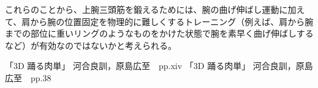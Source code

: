 \documentclass{jsarticle}
\begin{document}
これらのことから、上腕三頭筋を鍛えるためには、腕の曲げ伸ばし運動に加えて、肩から腕の位置固定を物理的に難しくするトレーニング（例えば、肩から腕までの部位に重いリングのようなものをかけた状態で腕を素早く曲げ伸ばしするなど）が有効なのではないかと考えられる。

\begin{thebibliography}{9}
	 「3D 踊る肉単」 河合良訓，原島広至　pp.xiv
	 「3D 踊る肉単」 河合良訓，原島広至　pp.38
\end{thebibliography}
\end{document}

